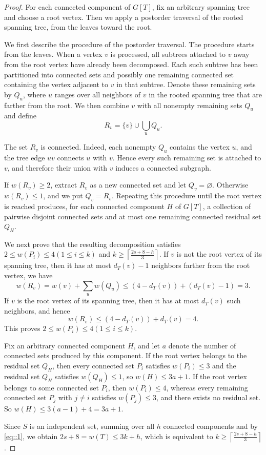 \documentclass[11pt]{article}
\theoremstyle{definition}
\begin{document}
\begin{proof}
  For each connected component of $G[T]$, fix an arbitrary spanning tree and choose
  a root vertex. Then we apply a postorder traversal of the rooted spanning tree, from the leaves toward the root.


  We first describe the procedure of the postorder traversal. The procedure starts from the leaves. When a vertex $v$ is processed, all subtrees attached to $v$ away from the root vertex have already been decomposed. Each such subtree has been partitioned into connected sets and possibly one remaining connected set containing the vertex adjacent to $v$ in that subtree. Denote these remaining sets by $Q_u$, where $u$ ranges over all neighbors of $v$ in the rooted spanning tree that are farther from the root. We then combine $v$ with all nonempty remaining sets $Q_u$ and define $$R_v=\{v\}\cup\bigcup_{u}Q_u.$$

  The set $R_v$ is connected. Indeed, each nonempty $Q_u$ contains the vertex $u$, and the tree edge $uv$ connects $u$ with $v$. Hence every such remaining set is attached to $v$, and therefore their union with $v$ induces a connected subgraph.

  If $w(R_v)\ge2$, extract $R_v$ as a new connected set and let $Q_v=\varnothing$. Otherwise $w(R_v)\le 1$, and we put $Q_v = R_v$. Repeating this procedure until the root vertex is reached produces, for each connected component $H$ of $G[T]$, a collection of pairwise disjoint connected sets and at most one remaining connected residual set $Q_H$.

  We next prove that the resulting decomposition satisfies $2\leq w(P_i)\leq 4(1\le i\le k)$ and $k\geq\left\lceil\frac{2s+8-h}{3}\right\rceil$. If $v$ is not the root vertex of its spanning tree, then it has at most $d_T(v)-1$ neighbors farther from the root vertex, we have $$w(R_v)=w(v)+\sum_uw(Q_u)\leq(4-d_T(v))+(d_T(v)-1)=3.$$
  If $v$ is the root vertex of its spanning tree, then it has at most $d_T(v)$ such neighbors, and hence $$w(R_v)\leq(4-d_T(v))+d_T(v)=4.$$
  This proves $2\leq w(P_i)\leq 4(1\le i\le k)$.

  Fix an arbitrary connected component $H$, and let $a$ denote the number of connected sets produced by this component. If the root vertex belongs to the residual set $Q_H$, then every connected set $P_{i}$ satisfies $w(P_{i})\leq  3$ and the residual set $Q_H$ satisfies $w(Q_{H})\le1$, so $w(H) \leq 3a+1$. If the root vertex belongs to some connected set $P_i$, then $w(P_{i})\leq 4$,  whereas every remaining connected set $P_j$ with $j\neq i$ satisfies $w(P_{j})\leq 3$, and there exists no residual set. So $w(H) \leq 3(a-1)+4=3a+1.$

  Since $S$ is an independent set, summing over all $h$ connected components and by \eqref{eq::1}, we obtain $2s+8=w(T)\leq 3k+h$,
  which is equivalent to $k\geq\left\lceil\frac{2s+8-h}{3}\right\rceil$.
\end{proof}
\end{document}
